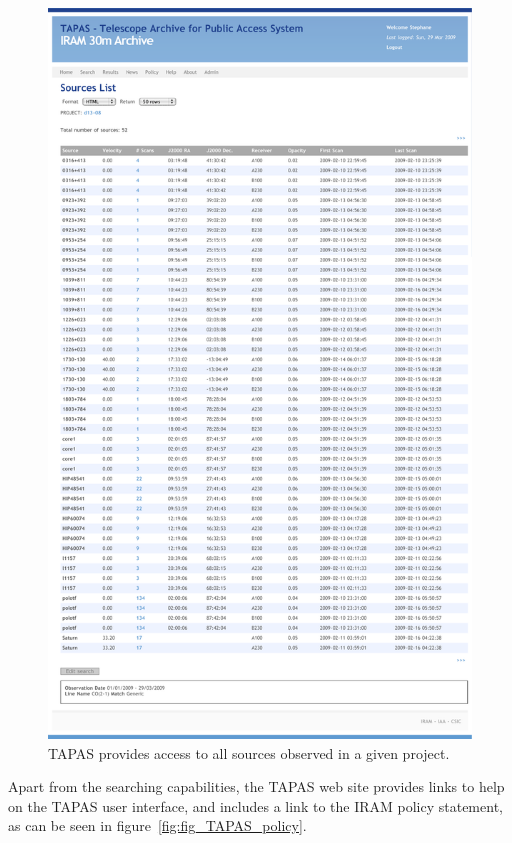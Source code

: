			\begin{figure}[tbp]
				\centering
					\includegraphics[totalheight=\textheight]
					{fig/TAPAS_projectSources.pdf}
				\caption[TAPAS project sources]{TAPAS
				provides access to all sources observed in
				a given project.}
				\label{fig:fig_TAPAS_projectSources}
			\end{figure}
			
			Apart from the searching capabilities, the TAPAS
			web site provides links to help on the TAPAS
			user interface, and includes a link to the IRAM policy
			statement, as can be seen in
			figure~\ref{fig:fig_TAPAS_policy}.
			
